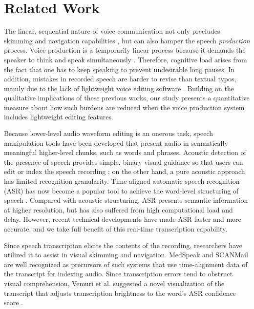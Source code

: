 \section{Related Work}

The linear, sequential nature of voice communication not only precludes skimming and navigation capabilities \cite{grudin}, but can also hamper the speech \emph{production} process. 
Voice production is a temporarily linear process because it demands the speaker to think and speak simultaneously \cite{marriott2002, yoon:2015}.
Therefore, cognitive load arises from the fact that one has to keep speaking to prevent undesirable long pauses. 
In addition, mistakes in recorded speech are harder to revise than textual typos, mainly due to the lack of lightweight voice editing software \cite{marriott2002}.  
Building on the qualitative implications of these previous works, our study presents a quantitative measure about how such burdens are reduced when the voice production system includes lightweight editing features.

Because lower-level audio waveform editing is an onerous task, speech manipulation tools have been developed that present audio in semantically meaningful higher-level chunks, such as words and phrases.
Acoustic detection of the presence of speech provides simple, binary visual guidance so that users can edit or index the speech recording \cite{ades1986, hindus:1992}; on the other hand, a pure acoustic approach has limited recognition granularity. 
Time-aligned automatic speech recognition (ASR) has now become a popular tool to achieve the word-level structuring of speech \cite{Schmandt81, Wilcox:1992}. 
Compared with acoustic structuring, ASR presents semantic information at higher resolution, but has also suffered from high computational load and delay. 
However, recent technical developments have made ASR faster and more accurate, and we take full benefit of this real-time transcription capability.

Since speech transcription elicits the contents of the recording, researchers have utilized it to assist in visual skimming and navigation. 
MedSpeak \cite{Lai:1997} and SCANMail \cite{whittaker} are well recognized as precursors of such systems that use time-alignment data of the transcript for indexing audio. 
Since transcription errors tend to obstruct visual comprehension, Vemuri et al. suggested a novel visualization of the transcript that adjusts transcription brightness to the word's ASR confidence score \cite{Vemuri:2004}. 

